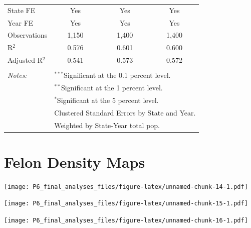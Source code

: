 \documentclass[11pt,]{article}
\begin{document}
\begin{table}[!htbp]
\begin{tabular}{@{\extracolsep{5pt}}lccc}
 State FE & Yes & Yes & Yes \\ 
Year FE & Yes & Yes & Yes \\ 
Observations & 1,150 & 1,400 & 1,400 \\ 
R$^{2}$ & 0.576 & 0.601 & 0.600 \\ 
Adjusted R$^{2}$ & 0.541 & 0.573 & 0.572 \\ 
\hline \\[-1.8ex] 
\textit{Notes:} & \multicolumn{3}{l}{$^{***}$Significant at the 0.1 percent level.} \\ 
 & \multicolumn{3}{l}{$^{**}$Significant at the 1 percent level.} \\ 
 & \multicolumn{3}{l}{$^{*}$Significant at the 5 percent level.} \\ 
 & \multicolumn{3}{l}{Clustered Standard Errors by State and Year.} \\ 
 & \multicolumn{3}{l}{Weighted by State-Year total pop.} \\ 
\end{tabular} 
\end{table}

\pagebreak

\section{Felon Density Maps}\label{felon-density-maps}

\texttt{[image: P6\_final\_analyses\_files/figure-latex/unnamed-chunk-14-1.pdf]}

\pagebreak

\texttt{[image: P6\_final\_analyses\_files/figure-latex/unnamed-chunk-15-1.pdf]}

\pagebreak

\texttt{[image: P6\_final\_analyses\_files/figure-latex/unnamed-chunk-16-1.pdf]}
\end{document}
